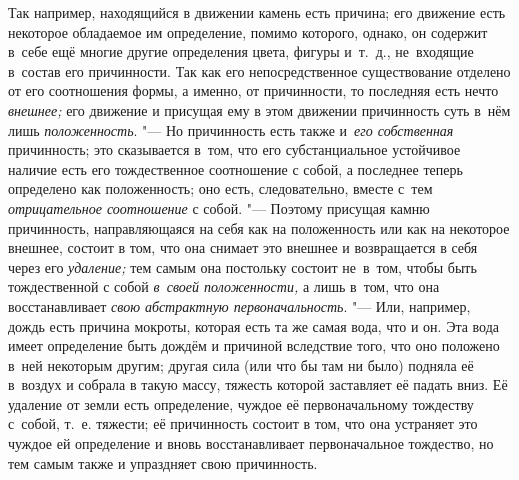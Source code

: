 Так например, находящийся в движении камень есть причина; его движение есть
некоторое обладаемое им определение, помимо которого, однако, он содержит
в~себе ещё многие другие определения цвета, фигуры и~т.~д., не~входящие
в~состав его причинности. Так как его непосредственное существование отделено
от его соотношения формы, а именно, от причинности, то последняя есть нечто
{\em внешнее;} его движение и присущая ему в этом движении причинность суть
в~нём лишь {\em положенность}. "--- Но причинность есть также и~{\em его
собственная} причинность; это сказывается в~том, что его субстанциальное
устойчивое наличие есть его тождественное соотношение с собой, а последнее
теперь определено как положенность; оно есть, следовательно, вместе с~тем
{\em отрицательное соотношение} с собой. "--- Поэтому присущая камню
причинность, направляющаяся на себя как на положенность или как на некоторое
внешнее, состоит в том, что она снимает это внешнее и возвращается в себя через
его {\em удаление;} тем самым она постольку состоит не~в~том, чтобы быть
тождественной с собой {\em в~своей положенности,} а лишь в~том, что она
восстанавливает {\em свою абстрактную первоначальность}. "--- Или, например,
дождь есть причина мокроты, которая есть та же самая вода, что и он. Эта вода
имеет определение быть дождём и причиной вследствие того, что оно положено
в~ней некоторым другим; другая сила (или что бы там ни было) подняла её
в~воздух и собрала в такую массу, тяжесть которой заставляет её падать вниз. Её
удаление от земли есть определение, чуждое её первоначальному тождеству
с~собой, т.~е. тяжести; её причинность состоит в том, что она устраняет это
чуждое ей определение и вновь восстанавливает первоначальное тождество, но тем
самым также и упраздняет свою причинность.

